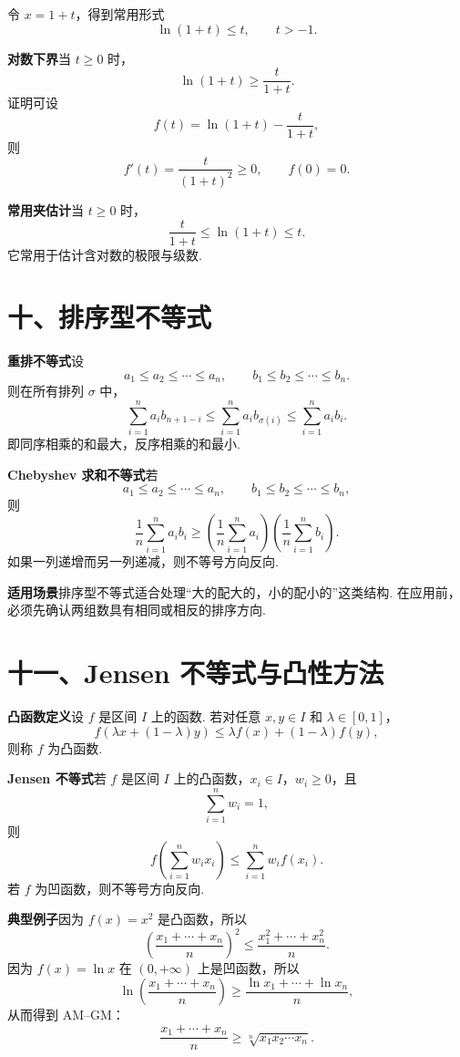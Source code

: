 \documentclass[UTF8,12pt,a4paper,fontset=fandol]{ctexart}
\begin{document}
令 $x=1+t$，得到常用形式
\[
  \ln(1+t)\le t,\qquad t>-1.
\]

\noindent\textbf{对数下界}\quad 当 $t\ge0$ 时，
\[
  \ln(1+t)\ge \frac{t}{1+t}.
\]
证明可设
\[
  f(t)=\ln(1+t)-\frac{t}{1+t},
\]
则
\[
  f'(t)=\frac{t}{(1+t)^2}\ge0,\qquad f(0)=0.
\]

\noindent\textbf{常用夹估计}\quad 当 $t\ge0$ 时，
\[
  \frac{t}{1+t}\le \ln(1+t)\le t.
\]
它常用于估计含对数的极限与级数.

\section*{十、排序型不等式}

\noindent\textbf{重排不等式}\quad 设
\[
  a_1\le a_2\le\cdots\le a_n,\qquad
  b_1\le b_2\le\cdots\le b_n.
\]
则在所有排列 $\sigma$ 中，
\[
  \sum_{i=1}^n a_i b_{n+1-i}
  \le
  \sum_{i=1}^n a_i b_{\sigma(i)}
  \le
  \sum_{i=1}^n a_i b_i.
\]
即同序相乘的和最大，反序相乘的和最小.

\noindent\textbf{Chebyshev 求和不等式}\quad 若
\[
  a_1\le a_2\le\cdots\le a_n,\qquad
  b_1\le b_2\le\cdots\le b_n,
\]
则
\[
  \frac1n\sum_{i=1}^n a_i b_i
  \ge
  \left(\frac1n\sum_{i=1}^n a_i\right)
  \left(\frac1n\sum_{i=1}^n b_i\right).
\]
如果一列递增而另一列递减，则不等号方向反向.

\noindent\textbf{适用场景}\quad 排序型不等式适合处理“大的配大的，小的配小的”这类结构. 在应用前，必须先确认两组数具有相同或相反的排序方向.

\section*{十一、Jensen 不等式与凸性方法}

\noindent\textbf{凸函数定义}\quad 设 $f$ 是区间 $I$ 上的函数. 若对任意 $x,y\in I$ 和 $\lambda\in[0,1]$，
\[
  f(\lambda x+(1-\lambda)y)
  \le
  \lambda f(x)+(1-\lambda)f(y),
\]
则称 $f$ 为凸函数.

\noindent\textbf{Jensen 不等式}\quad 若 $f$ 是区间 $I$ 上的凸函数，$x_i\in I$，$w_i\ge0$，且
\[
  \sum_{i=1}^n w_i=1,
\]
则
\[
  f\left(\sum_{i=1}^n w_i x_i\right)
  \le
  \sum_{i=1}^n w_i f(x_i).
\]
若 $f$ 为凹函数，则不等号方向反向.

\noindent\textbf{典型例子}\quad 因为 $f(x)=x^2$ 是凸函数，所以
\[
  \left(\frac{x_1+\cdots+x_n}{n}\right)^2
  \le
  \frac{x_1^2+\cdots+x_n^2}{n}.
\]
因为 $f(x)=\ln x$ 在 $(0,+\infty)$ 上是凹函数，所以
\[
  \ln\left(\frac{x_1+\cdots+x_n}{n}\right)
  \ge
  \frac{\ln x_1+\cdots+\ln x_n}{n},
\]
从而得到 AM--GM：
\[
  \frac{x_1+\cdots+x_n}{n}
  \ge
  \sqrt[n]{x_1x_2\cdots x_n}.
\]
\end{document}
